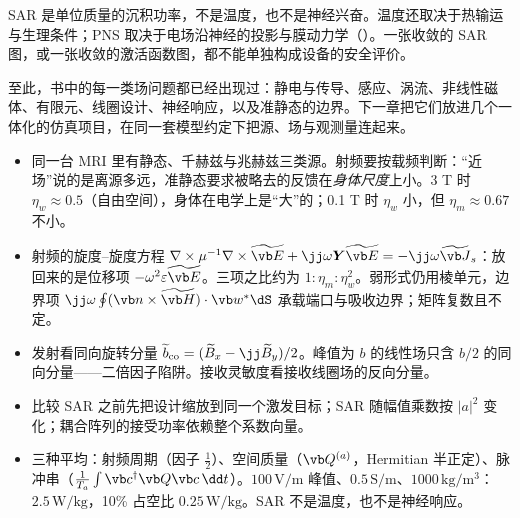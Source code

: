 \begin{pitfall}
SAR 是单位质量的沉积功率，不是温度，也不是神经兴奋。温度还取决于热输运与生理条件；PNS 取决于电场沿神经的投影与膜动力学（）。一张收敛的 SAR 图，或一张收敛的激活函数图，都不能单独构成设备的安全评价。
\end{pitfall}

至此，书中的每一类场问题都已经出现过：静电与传导、感应、涡流、非线性磁体、有限元、线圈设计、神经响应，以及准静态的边界。下一章把它们放进几个一体化的仿真项目，在同一套模型约定下把源、场与观测量连起来。

\begin{takeaways}
\begin{itemize}
\item 同一台 MRI 里有静态、千赫兹与兆赫兹三类源。射频要按载频判断：“近场”说的是离源多远，准静态要求被略去的反馈在\emph{身体尺度}上小。3 T 时 $\eta_w\approx0.5$（自由空间），身体在电学上是“大”的；0.1 T 时 $\eta_w$ 小，但 $\eta_m\approx0.67$ 不小。
\item 射频的旋度--旋度方程 $\nabla\times\mu^{-1}\nabla\times\widetilde{\vb E}+\jj\omega\boldsymbol Y\widetilde{\vb E}=-\jj\omega\widetilde{\vb J}_s$：放回来的是位移项 $-\omega^2\varepsilon\widetilde{\vb E}$。三项之比约为 $1:\eta_m:\eta_w^2$。弱形式仍用棱单元，边界项 $\jj\omega\oint(\vb n\times\widetilde{\vb H})\cdot\vb w^*\dS$ 承载端口与吸收边界；矩阵复数且不定。
\item 发射看同向旋转分量 $\widetilde b_{\rm co}=(\widetilde B_x-\jj\widetilde B_y)/2$。峰值为 $b$ 的线性场只含 $b/2$ 的同向分量——二倍因子陷阱。接收灵敏度看接收线圈场的反向分量。
\item 比较 SAR 之前先把设计缩放到同一个激发目标；SAR 随幅值乘数按 $|a|^2$ 变化；耦合阵列的接受功率依赖整个系数向量。
\item 三种平均：射频周期（因子 $\tfrac12$）、空间质量（$\vb Q^{(a)}$，Hermitian 半正定）、脉冲串（$\tfrac1{T_a}\int\vb c^\dagger\vb Q\vb c\,\dd t$）。$100\,\mathrm{V/m}$ 峰值、$0.5\,\mathrm{S/m}$、$1000\,\mathrm{kg/m^3}$：$2.5\,\mathrm{W/kg}$，10\% 占空比 $0.25\,\mathrm{W/kg}$。SAR 不是温度，也不是神经响应。
\end{itemize}
\end{takeaways}

